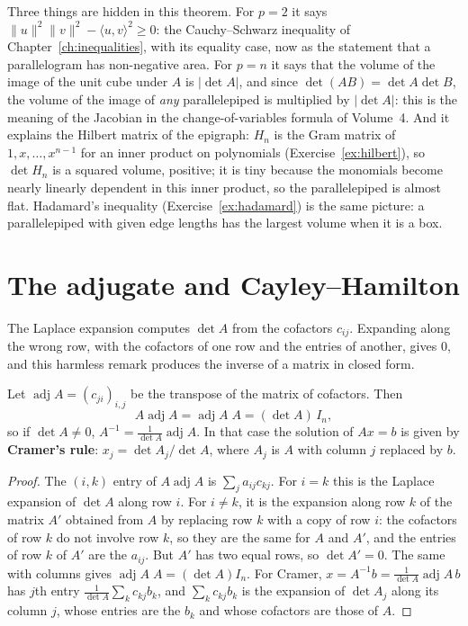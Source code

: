 Three things are hidden in this theorem. For $p=2$ it says $\|u\|^2\|v\|^2-\langle u,v\rangle^2\ge0$: the Cauchy--Schwarz inequality of Chapter~\ref{ch:inequalities}, with its equality case, now as the statement that a parallelogram has non-negative area. For $p=n$ it says that the volume of the image of the unit cube under $A$ is $|\det A|$, and since $\det(AB)=\det A\det B$, the volume of the image of \emph{any} parallelepiped is multiplied by $|\det A|$: this is the meaning of the Jacobian in the change-of-variables formula of Volume~4. And it explains the Hilbert matrix of the epigraph: $H_n$ is the Gram matrix of $1,x,\dots,x^{n-1}$ for an inner product on polynomials (Exercise~\ref{ex:hilbert}), so $\det H_n$ is a squared volume, positive; it is tiny because the monomials become nearly linearly dependent in this inner product, so the parallelepiped is almost flat. Hadamard's inequality (Exercise~\ref{ex:hadamard}) is the same picture: a parallelepiped with given edge lengths has the largest volume when it is a box.

\section{The adjugate and Cayley--Hamilton}

The Laplace expansion computes $\det A$ from the cofactors $c_{ij}$. Expanding along the wrong row, with the cofactors of one row and the entries of another, gives $0$, and this harmless remark produces the inverse of a matrix in closed form.

\begin{proposition}\label{prop:adjugate}
Let $\operatorname{adj}A=(c_{ji})_{i,j}$ be the transpose of the matrix of cofactors. Then
\[
A\operatorname{adj}A=\operatorname{adj}A\;A=(\det A)\,I_n ,
\]
so if $\det A\ne0$, $A^{-1}=\frac1{\det A}\operatorname{adj}A$. In that case the solution of $Ax=b$ is given by \textbf{Cramer's rule}: $x_j=\det A_j/\det A$, where $A_j$ is $A$ with column $j$ replaced by $b$.
\end{proposition}
\begin{proof}
The $(i,k)$ entry of $A\operatorname{adj}A$ is $\sum_ja_{ij}c_{kj}$. For $i=k$ this is the Laplace expansion of $\det A$ along row $i$. For $i\ne k$, it is the expansion along row $k$ of the matrix $A'$ obtained from $A$ by replacing row $k$ with a copy of row $i$: the cofactors of row $k$ do not involve row $k$, so they are the same for $A$ and $A'$, and the entries of row $k$ of $A'$ are the $a_{ij}$. But $A'$ has two equal rows, so $\det A'=0$. The same with columns gives $\operatorname{adj}A\;A=(\det A)I_n$. For Cramer, $x=A^{-1}b=\frac1{\det A}\operatorname{adj}A\,b$ has $j$th entry $\frac1{\det A}\sum_kc_{kj}b_k$, and $\sum_kc_{kj}b_k$ is the expansion of $\det A_j$ along its column $j$, whose entries are the $b_k$ and whose cofactors are those of $A$.
\end{proof}

